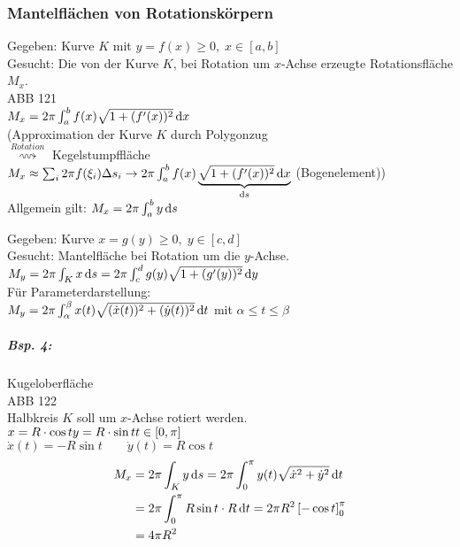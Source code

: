 \subsubsection{Mantelflächen von Rotationskörpern}
\begin{anumerate}
\item Gegeben: Kurve $K$ mit $y=f(x)\geq 0, \; x \in [a,b]$\\
Gesucht: Die von der Kurve $K$, bei Rotation um $x$-Achse erzeugte Rotationsfläche $M_x$.\\
ABB 121\\
$M_x=2\pi \int_a^b f(x) \sqrt{1+(f'(x))^2}\,\mathrm{d}x$\\
(Approximation der Kurve $K$ durch Polygonzug\\
$\overset{Rotation}{\rightsquigarrow}$ Kegelstumpffläche\\
$M_x\approx \sum_i 2\pi f(\xi_i)\Delta s_i\\
\to 2\pi \int_a^b f(x)\underbrace{\sqrt{1+(f'(x))^2}\,\mathrm{d}x}_{\mathrm{d}s}$ (Bogenelement))\\
Allgemein gilt: $M_x=2\pi \int_a^by\,\mathrm{d}s$
\item Gegeben: Kurve $x=g(y) \geq 0, \; y\in [c,d]$\\
Gesucht: Mantelfläche bei Rotation um die $y$-Achse.\\
$M_y=2\pi \int_K x \,\mathrm{d}s=2\pi \int_c^d g(y) \sqrt{1+(g'(y))^2}\,\mathrm{d}y$\\
Für Parameterdarstellung:\\
$M_y=2\pi \int_{\alpha}^{\beta} x(t) \sqrt{(\dot{x}(t))^2+(\dot{y}(t))^2}\,\mathrm{d}t$ mit $\alpha \leq t \leq \beta$
\subparagraph{Bsp. 4:} Kugeloberfläche\\
ABB 122\\
Halbkreis $K$ soll um $x$-Achse rotiert werden.\\
$x=R\cdot \cos t\\
y = R \cdot \sin t\\
t \in [0,\pi]$\\
$\dot{x}(t) = -R \sin t \qquad \dot{y}(t) = R \cos t$
\begin{align*}
M_x&= 2\pi \int_K y\,\mathrm{d}s=2\pi \int_0^{\pi} y(t) \sqrt{\dot{x}^2+\dot{y}^2}\,\mathrm{d}t\\
&= 2\pi \int_0^{\pi} R \sin t \cdot R \,\mathrm{d}t = 2\pi R^2 \left[-\cos t\right]_0^{\pi}\\
&= 4\pi R^2
\end{align*}
\end{anumerate}
